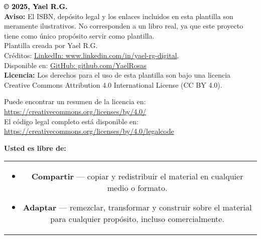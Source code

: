 \thispagestyle{empty} %

\begin{center}
\vspace*{1cm}
\textcolor{black}{\Large \textbf{© 2025, Yael R.G.}} \\[0.3cm]

\textbf{Aviso:} El ISBN, depósito legal y los enlaces incluidos en esta plantilla son meramente ilustrativos. No corresponden a un libro real, ya que este proyecto tiene como único propósito servir como plantilla. \\[0.5cm]


Plantilla creada por Yael R.G. \\[0.3cm]
Créditos: \href{https://www.linkedin.com/in/yael-rg-digital}{LinkedIn: www.linkedin.com/in/yael-rg-digital}. \\[0.3cm]
Disponible en: \href{https://github.com/YaelRosas}{GitHub: github.com/YaelRosas} \\[0.5cm]

\textbf{Licencia:} Los derechos para el uso de esta plantilla son bajo una licencia Creative Commons Attribution 4.0 International License (CC BY 4.0). \\[0.5cm]

\begin{center}
    Puede encontrar un resumen de la licencia en: \\
    \url{https://creativecommons.org/licenses/by/4.0/} \\[0.5cm]
    
    El código legal completo está disponible en: \\
    \url{https://creativecommons.org/licenses/by/4.0/legalcode}
    \end{center}
    

\textbf{Usted es libre de:}
\end{center}

\begin{center}
\begin{tabular}{c}
\begin{minipage}{0.9\textwidth}
\begin{itemize}
    \item \textbf{Compartir} — copiar y redistribuir el material en cualquier medio o formato.
    \item \textbf{Adaptar} — remezclar, transformar y construir sobre el material para cualquier propósito, incluso comercialmente.
\end{itemize}
\end{minipage}
\end{tabular}
\end{center}

